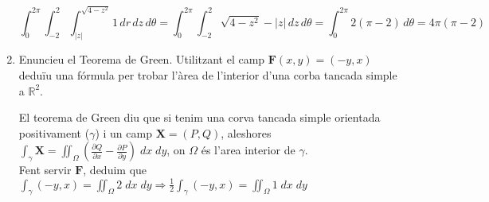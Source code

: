 \documentclass[a4paper, 12pt]{article}
\begin{document}
\begin{exercici}
\begin{enumerate}[label=\alph*)]
\begin{solucio}
                \begin{displaymath}
                    \int_{0}^{2\pi} \int_{-2}^2 \int_{\left\lvert z\right\rvert}^{\sqrt{4-z^2}} 1\,dr\, dz\, d\theta = \int_{0}^{2\pi} \int_{-2}^2 \sqrt{4-z^2} - \left\lvert z\right\rvert\, dz\, d\theta = \int_{0}^{2\pi} 2\left(\pi-2\right)\, d\theta = 4\pi\left(\pi-2\right)
                \end{displaymath}
            \end{solucio}
            \item Enuncieu el Teorema de Green. Utilitzant el camp \( \mathbf{F}(x, y) = (-y, x) \) deduïu una fórmula per trobar l'àrea de l'interior d'una corba tancada simple a \( \mathbb{R}^2 \).\\
            \begin{solucio}
                El teorema de Green diu que si tenim una corva tancada simple orientada positivament ($\gamma$)
                i un camp $\mathbf{X} = \left(P, Q\right)$, aleshores
                $\int_\gamma \mathbf{X} = \iint_\Omega \left(\frac{\partial Q}{\partial x} - \frac{\partial P}{\partial y}\right)\;dx\;dy$, on $\Omega$ és l'area interior de $\gamma$.\\
                Fent servir $\mathbf{F}$, deduim que $\int_{\gamma} \left(-y, x\right) = \iint_\Omega 2 \;dx\;dy \Rightarrow \frac{1}{2}\int_{\gamma} \left(-y, x\right) = \iint_\Omega 1 \;dx\;dy$
            \end{solucio}
        \end{enumerate}
    \end{exercici}
\end{document}
